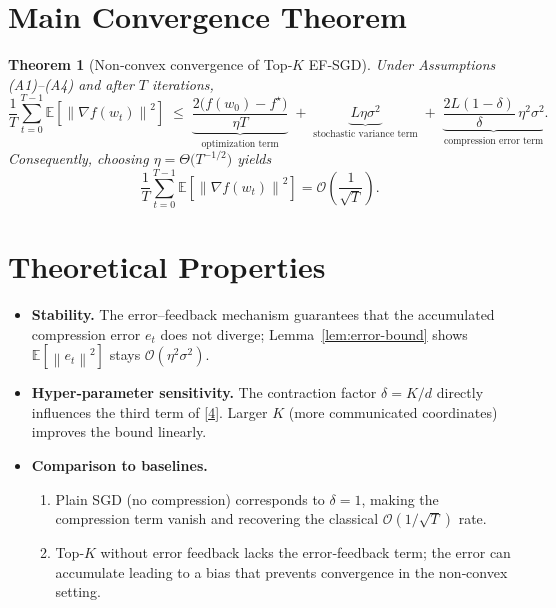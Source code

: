 \documentclass{article}
\newtheorem{theorem}{Theorem}
\newcommand{\E}{\mathbb{E}}
\newcommand{\norm}[1]{\left\|#1\right\|}
\begin{document}
\section*{Main Convergence Theorem}
\begin{theorem}[Non‑convex convergence of Top‑$K$ EF‑SGD]\label{thm:main}
Under Assumptions (A1)–(A4) and after $T$ iterations,
\[
\frac{1}{T}\sum_{t=0}^{T-1}\E\!\left[\norm{\nabla f(w_{t})}^{2}\right]
\;\le\;
\underbrace{\frac{2\bigl(f(w_{0})-f^{\star}\bigr)}{\eta T}}_{\text{optimization term}}
\;+\;
\underbrace{L\eta\sigma^{2}}_{\text{stochastic variance term}}
\;+\;
\underbrace{\frac{2L(1-\delta)}{\delta}\,\eta^{2}\sigma^{2}}_{\text{compression error term}} .
\tag{4}
\]
Consequently, choosing $\eta=\Theta\!\bigl(T^{-1/2}\bigr)$ yields
\[
\frac{1}{T}\sum_{t=0}^{T-1}\E\!\left[\norm{\nabla f(w_{t})}^{2}\right]=\mathcal{O}\!\left(\frac{1}{\sqrt{T}}\right).
\]
\end{theorem}

\section*{Theoretical Properties}
\begin{itemize}
\item \textbf{Stability.} The error–feedback mechanism guarantees that the accumulated compression error $e_{t}$ does not diverge; Lemma~\ref{lem:error-bound} shows $\E[\norm{e_{t}}^{2}]$ stays $\mathcal{O}(\eta^{2}\sigma^{2})$.
\item \textbf{Hyper‑parameter sensitivity.} The contraction factor $\delta=K/d$ directly influences the third term of \eqref{4}. Larger $K$ (more communicated coordinates) improves the bound linearly.
\item \textbf{Comparison to baselines.}
    \begin{enumerate}
    \item Plain SGD (no compression) corresponds to $\delta=1$, making the compression term vanish and recovering the classical $\mathcal{O}(1/\sqrt{T})$ rate.
    \item Top‑$K$ without error feedback lacks the error‑feedback term; the error can accumulate leading to a bias that prevents convergence in the non‑convex setting.
    \end{enumerate}
\end{itemize}

\end{document}
